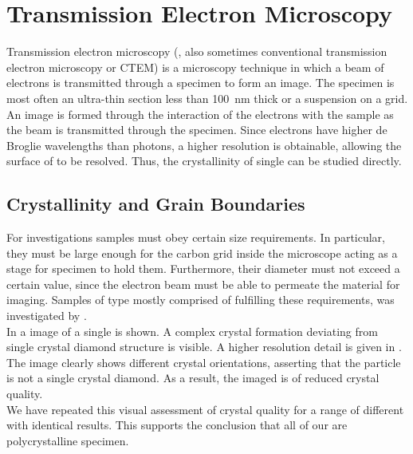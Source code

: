 		\section{Transmission Electron Microscopy}{\label{sec::tem}}

			Transmission electron microscopy (\TEM, also sometimes conventional transmission electron microscopy or CTEM) is a microscopy technique in which a beam of electrons is transmitted through a specimen to form an image. The specimen is most often an ultra-thin section less than \SI{100}{\nm} thick or a suspension on a grid. An image is formed through the interaction of the electrons with the sample as the beam is transmitted through the specimen.
			Since electrons have higher de Broglie wavelengths than photons, a higher resolution is obtainable, allowing the surface of \nds to be resolved. Thus, the crystallinity of single \nds can be studied directly.


			\subsection{Crystallinity and Grain Boundaries}\label{subsec::tem_crystal}

				For \TEM investigations \nd samples must obey certain size requirements.
				In particular, they must be large enough for the carbon grid inside the microscope acting as a stage for specimen to hold them.
				Furthermore, their diameter must not exceed a certain value, since the \TEM electron beam must be able to permeate the material for imaging.
				Samples of type \insituH mostly comprised of \nds fulfilling these requirements, was investigated by \schmauch.
				\\
				In  a \TEM image of a single \nd is shown. A complex crystal formation deviating from single crystal diamond structure is visible. A higher resolution detail is given in . The image clearly shows different crystal orientations, asserting that the \nd particle is not a single crystal diamond. As a result, the imaged \nd is of reduced crystal quality.
				\\
				We have repeated this visual assessment of crystal quality for a range of different \nds with identical results. This supports the conclusion that all of our \nds are polycrystalline specimen.

